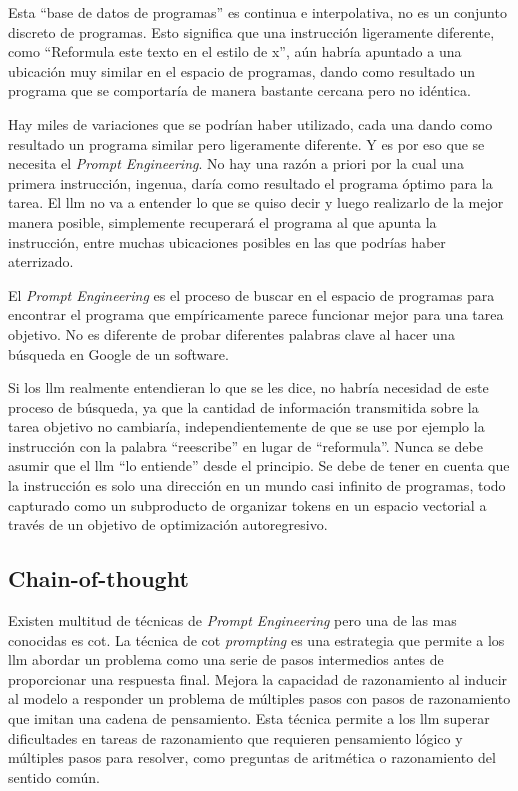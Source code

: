 Esta ``base de datos de programas'' es continua e interpolativa, no es un conjunto discreto de programas. Esto significa que una instrucción ligeramente diferente, como ``Reformula este texto en el estilo de x'', aún habría apuntado a una ubicación muy similar en el espacio de programas, dando como resultado un programa que se comportaría de manera bastante cercana pero no idéntica.

Hay miles de variaciones que se podrían haber utilizado, cada una dando como resultado un programa similar pero ligeramente diferente. Y es por eso que se necesita el \textit{Prompt Engineering}. No hay una razón a priori por la cual una primera instrucción, ingenua, daría como resultado el programa óptimo para la tarea. El \acrshort{llm} no va a entender lo que se quiso decir y luego realizarlo de la mejor manera posible, simplemente recuperará el programa al que apunta la instrucción, entre muchas ubicaciones posibles en las que podrías haber aterrizado.

El \textit{Prompt Engineering} es el proceso de buscar en el espacio de programas para encontrar el programa que empíricamente parece funcionar mejor para una tarea objetivo. No es diferente de probar diferentes palabras clave al hacer una búsqueda en Google de un software.

Si los \acrshort{llm} realmente entendieran lo que se les dice, no habría necesidad de este proceso de búsqueda, ya que la cantidad de información transmitida sobre la tarea objetivo no cambiaría, independientemente de que se use por ejemplo la instrucción con la palabra ``reescribe'' en lugar de ``reformula''. Nunca se debe asumir que el \acrshort{llm} ``lo entiende'' desde el principio. Se debe de tener en cuenta que la instrucción es solo una dirección en un mundo casi infinito de programas, todo capturado como un subproducto de organizar tokens en un espacio vectorial a través de un objetivo de optimización autoregresivo.

\subsection{Chain-of-thought}

Existen multitud de técnicas de \textit{Prompt Engineering} pero una de las mas conocidas es \acrfull{cot}. La técnica de \acrlong{cot} \textit{prompting} es una estrategia que permite a los \acrshort{llm} abordar un problema como una serie de pasos intermedios antes de proporcionar una respuesta final. Mejora la capacidad de razonamiento al inducir al modelo a responder un problema de múltiples pasos con pasos de razonamiento que imitan una cadena de pensamiento. Esta técnica permite a los \acrshort{llm} superar dificultades en tareas de razonamiento que requieren pensamiento lógico y múltiples pasos para resolver, como preguntas de aritmética o razonamiento del sentido común.

